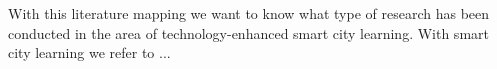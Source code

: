 With this literature mapping we want to know what type of research has been conducted in the area of technology-enhanced smart city learning. With smart city learning we refer to ...